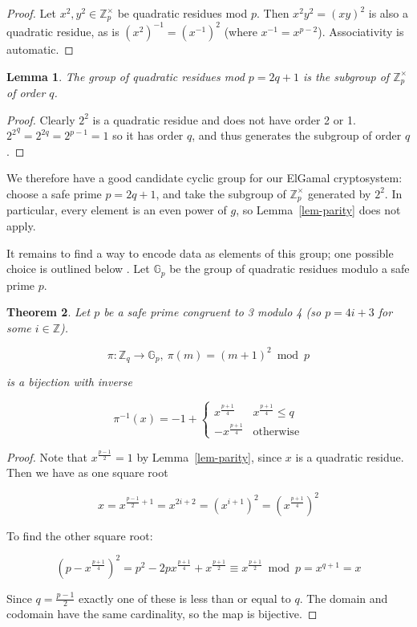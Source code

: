 \documentclass[12pt,a4paper]{article}
\newtheorem{theorem}{Theorem}
\newtheorem{lemma}[theorem]{Lemma}
\theoremstyle{definition}
\begin{document}
\begin{proof}
    Let $x^2,y^2\in\mathbb{Z}^\times_p$ be quadratic residues mod $p$. Then $x^2y^2=(xy)^2$ is also a quadratic residue, as is $(x^2)^{-1}=(x^{-1})^2$ (where $x^{-1}=x^{p-2}$). Associativity is automatic.
\end{proof}
\begin{lemma}
    The group of quadratic residues mod $p=2q+1$ is the subgroup of $\mathbb{Z}^\times_p$ of order $q$.
\end{lemma}
\begin{proof}
    Clearly $2^2$ is a quadratic residue and does not have order 2 or 1. ${2^2}^q=2^{2q}=2^{p-1}=1$ so it has order $q$, and thus generates the subgroup of order $q$.
\end{proof}
We therefore have a good candidate cyclic group for our ElGamal cryptosystem: choose a safe prime $p=2q+1$, and take the subgroup of $\mathbb{Z}^\times_p$ generated by $2^2$. In particular, every element is an even power of $g$, so Lemma~\ref{lem-parity} does not apply.

It remains to find a way to encode data as elements of this group; one possible choice is outlined below \cite{katz2014introduction}. Let $\mathbb{G}_p$ be the group of quadratic residues modulo a safe prime $p$.
\begin{theorem}
    Let $p$ be a safe prime congruent to 3 modulo 4 (so $p=4i+3$ for some $i\in\mathbb{Z}$).

    $$\pi:\mathbb{Z}_q\rightarrow\mathbb{G}_p,\ \pi(m)=(m+1)^2\bmod p$$

    is a bijection with inverse

    $$\pi^{-1}(x)=-1+\begin{cases}
        x^\frac{p+1}{4} & x^\frac{p+1}{4}\leq q\\
        -x^\frac{p+1}{4}&\text{otherwise}
    \end{cases}$$

\end{theorem}
\begin{proof}
    Note that $x^\frac{p-1}{2}=1$ by Lemma~\ref{lem-parity}, since $x$ is a quadratic residue. Then we have as one square root

    $$x=x^{\frac{p-1}{2}+1}=x^{2i+2}=(x^{i+1})^2=\left(x^\frac{p+1}{4}\right)^2$$

    To find the other square root:

    $$\left(p-x^\frac{p+1}{4}\right)^2=p^2-2px^\frac{p+1}{4}+x^\frac{p+1}{2}\equiv x^\frac{p+1}{2}\bmod p=x^{q+1}=x$$

    Since $q=\frac{p-1}{2}$ exactly one of these is less than or equal to $q$. The domain and codomain have the same cardinality, so the map is bijective.



\end{proof}
\end{document}
